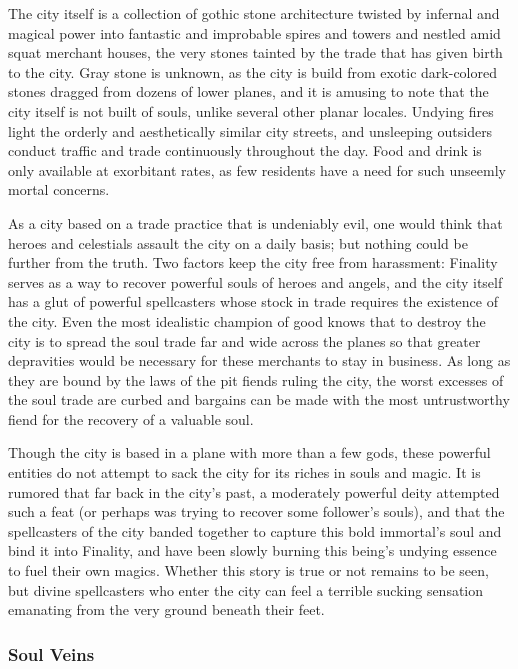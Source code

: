 The city itself is a collection of gothic stone architecture twisted by infernal and magical power into fantastic and improbable spires and towers and nestled amid squat merchant houses, the very stones tainted by the trade that has given birth to the city. Gray stone is unknown, as the city is build from exotic dark-colored stones dragged from dozens of lower planes, and it is amusing to note that the city itself is not built of souls, unlike several other planar locales. Undying fires light the orderly and aesthetically similar city streets, and unsleeping outsiders conduct traffic and trade continuously throughout the day. Food and drink is only available at exorbitant rates, as few residents have a need for such unseemly mortal concerns.

As a city based on a trade practice that is undeniably evil, one would think that heroes and celestials assault the city on a daily basis; but nothing could be further from the truth. Two factors keep the city free from harassment: Finality serves as a way to recover powerful souls of heroes and angels, and the city itself has a glut of powerful spellcasters whose stock in trade requires the existence of the city. Even the most idealistic champion of good knows that to destroy the city is to spread the soul trade far and wide across the planes so that greater depravities would be necessary for these merchants to stay in business. As long as they are bound by the laws of the pit fiends ruling the city, the worst excesses of the soul trade are curbed and bargains can be made with the most untrustworthy fiend for the recovery of a valuable soul.

Though the city is based in a plane with more than a few gods, these powerful entities do not attempt to sack the city for its riches in souls and magic. It is rumored that far back in the city's past, a moderately powerful deity attempted such a feat (or perhaps was trying to recover some follower's souls), and that the spellcasters of the city banded together to capture this bold immortal's soul and bind it into Finality, and have been slowly burning this being's undying essence to fuel their own magics. Whether this story is true or not remains to be seen, but divine spellcasters who enter the city can feel a terrible sucking sensation emanating from the very ground beneath their feet.

\subsubsection{Soul Veins}

